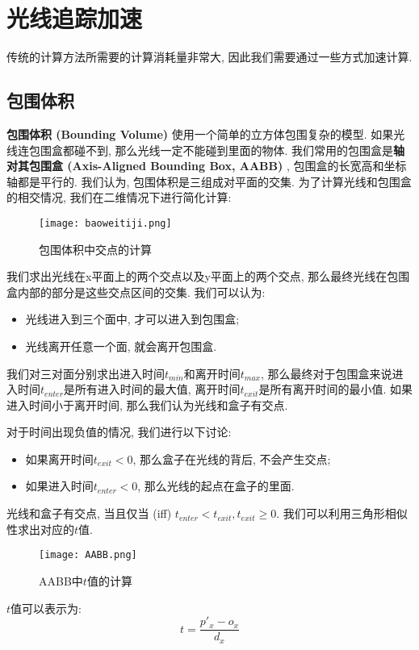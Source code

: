 \section{光线追踪加速}
传统的计算方法所需要的计算消耗量非常大, 因此我们需要通过一些方式加速计算. 
\subsection{包围体积}
\textbf{包围体积 (Bounding Volume) }使用一个简单的立方体包围复杂的模型. 如果光线连包围盒都碰不到, 那么光线一定不能碰到里面的物体. 
我们常用的包围盒是\textbf{轴对其包围盒 (Axis-Aligned Bounding Box,  AABB) }, 包围盒的长宽高和坐标轴都是平行的. 我们认为, 包围体积是三组成对平面的交集. 为了计算光线和包围盒的相交情况, 我们在二维情况下进行简化计算: 
\begin{figure}[H]
	\centering
	\texttt{[image: baoweitiji.png]}
	\caption{包围体积中交点的计算}
	\label{fig:bwtj}
\end{figure}

我们求出光线在x平面上的两个交点以及y平面上的两个交点, 那么最终光线在包围盒内部的部分是这些交点区间的交集. 我们可以认为: 
\begin{itemize}
	\item 光线进入到三个面中, 才可以进入到包围盒; 
	\item 光线离开任意一个面, 就会离开包围盒. 
\end{itemize}
我们对三对面分别求出进入时间$t_{min}$和离开时间$t_{max}$, 那么最终对于包围盒来说进入时间$t_{enter}$是所有进入时间的最大值, 离开时间$t_{exit}$是所有离开时间的最小值. 如果进入时间小于离开时间, 那么我们认为光线和盒子有交点. 

对于时间出现负值的情况, 我们进行以下讨论: 
\begin{itemize}
	\item 如果离开时间$t_{exit}<0$, 那么盒子在光线的背后, 不会产生交点; 
	\item 如果进入时间$t_{enter} < 0$, 那么光线的起点在盒子的里面. 
\end{itemize}

光线和盒子有交点, 当且仅当 (iff) $t_{enter}<t_{exit}, t_{exit}\geq 0$.
我们可以利用三角形相似性求出对应的$t$值. 
\begin{figure}[H]
	\centering
	\texttt{[image: AABB.png]}
	\caption{AABB中$t$值的计算}
	\label{fig:aabb}
\end{figure}
$t$值可以表示为: 
\begin{equation}
	t=\frac{p'_x-o_x}{d_x}
\end{equation}

